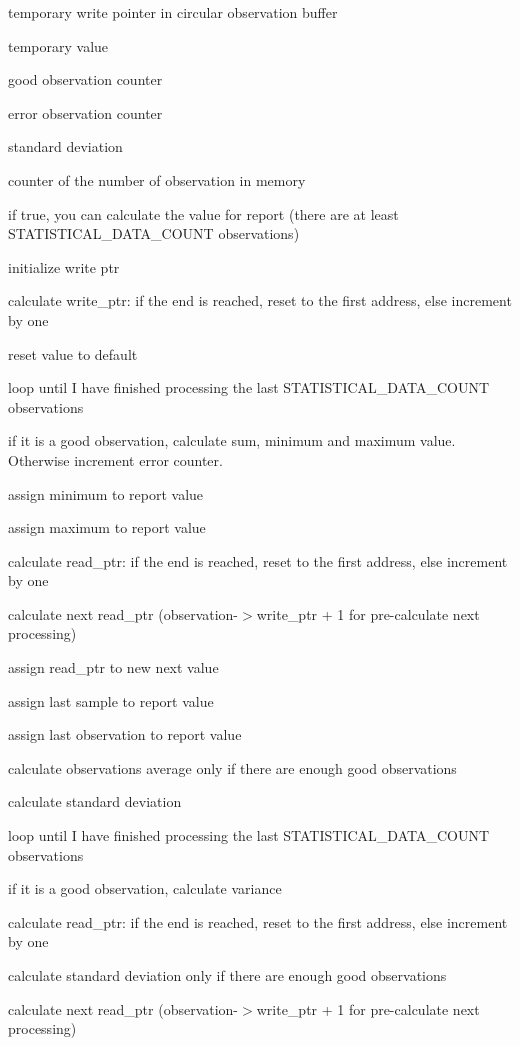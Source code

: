 temporary write pointer in circular observation buffer

temporary value

good observation counter

error observation counter

standard deviation

counter of the number of observation in memory

if true, you can calculate the value for report (there are at least S\+T\+A\+T\+I\+S\+T\+I\+C\+A\+L\+\_\+\+D\+A\+T\+A\+\_\+\+C\+O\+U\+NT observations)

initialize write ptr

calculate write\+\_\+ptr\+: if the end is reached, reset to the first address, else increment by one

reset value to default

loop until I have finished processing the last S\+T\+A\+T\+I\+S\+T\+I\+C\+A\+L\+\_\+\+D\+A\+T\+A\+\_\+\+C\+O\+U\+NT observations

if it is a good observation, calculate sum, minimum and maximum value. Otherwise increment error counter.

assign minimum to report value

assign maximum to report value

calculate read\+\_\+ptr\+: if the end is reached, reset to the first address, else increment by one

calculate next read\+\_\+ptr (observation-\/$>$write\+\_\+ptr + 1 for pre-\/calculate next processing)

assign read\+\_\+ptr to new next value

assign last sample to report value

assign last observation to report value

calculate observations average only if there are enough good observations

calculate standard deviation

loop until I have finished processing the last S\+T\+A\+T\+I\+S\+T\+I\+C\+A\+L\+\_\+\+D\+A\+T\+A\+\_\+\+C\+O\+U\+NT observations

if it is a good observation, calculate variance

calculate read\+\_\+ptr\+: if the end is reached, reset to the first address, else increment by one

calculate standard deviation only if there are enough good observations

calculate next read\+\_\+ptr (observation-\/$>$write\+\_\+ptr + 1 for pre-\/calculate next processing)

